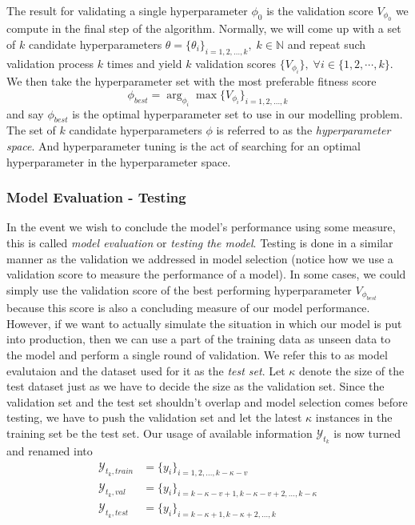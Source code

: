 The result for validating a single hyperparameter $\phi_0$ is the validation score $V_{\phi_0}$ we compute in the final step of the algorithm. Normally, we will come up with a set of $k$ candidate hyperparameters $\theta = \{ \theta_i \}_{i = 1, 2, \ldots, k}, \; k \in \mathbb{N}$ and repeat such validation process $k$ times and yield $k$ validation scores $\{ V_{\phi_i} \}, \; \forall i \in \{1, 2, \cdots, k \}$. We then take the hyperparameter set with the most preferable fitness score
\begin{equation*} 
    \phi_{best} = \arg_{\phi_i} \max \{ V_{\phi_i} \}_{i = 1, 2, \ldots, k}
\end{equation*}
and say $\phi_{best}$ is the optimal hyperparameter set to use in our modelling problem. The set of $k$ candidate hyperparameters $\phi$ is referred to as the \textit{hyperparameter space}. And hyperparameter tuning is the act of searching for an optimal hyperparameter in the hyperparameter space.

\subsubsection{Model Evaluation - Testing}
In the event we wish to conclude the model's performance using some measure, this is called \textit{model evaluation} or \textit{testing the model}. Testing is done in a similar manner as the validation we addressed in model selection (notice how we use a validation score to measure the performance of a model). In some cases, we could simply use the validation score of the best performing hyperparameter $V_{\phi_{best}}$ because this score is also a concluding measure of our model performance. However, if we want to actually simulate the situation in which our model is put into production, then we can use a part of the training data as unseen data to the model and perform a single round of validation. We refer this to as model evalutaion and the dataset used for it as the \textit{test set}. Let $\kappa$ denote the size of the test dataset just as we have to decide the size as the validation set. Since the validation set and the test set shouldn't overlap and model selection comes before testing, we have to push the validation set and let the latest $\kappa$ instances in the training set be the test set. Our usage of available information $\mathcal{Y}_{t_k}$ is now turned and renamed into
\begin{align*}
    \mathcal{Y}_{t_k, train} &= \{y_i \}_{i = 1, 2, \ldots, k - \kappa - v}                 \\
    \mathcal{Y}_{t_k, val} &= \{y_i \}_{i = k-\kappa-v+1,k-\kappa-v+2, \ldots, k-\kappa}  \\
    \mathcal{Y}_{t_k, test} &= \{y_i \}_{i = k-\kappa+1,k-\kappa+2, \ldots, k}
\end{align*}

